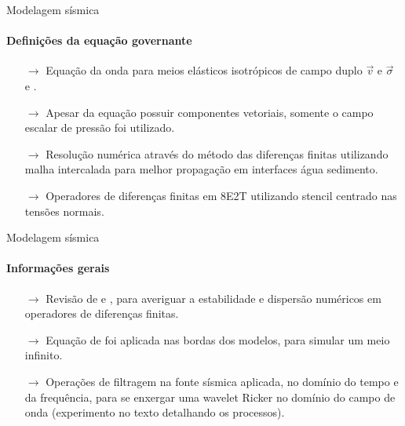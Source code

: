 \documentclass[xcolor=dvipsnames,t]{beamer}
\begin{document}
\begin{frame}{Modelagem sísmica}
\framesubtitle{Definições da equação governante}	
	
\pause
\begin{itemize}
	\small
	\item[$\to$] Equação da onda para meios elásticos isotrópicos de campo duplo $\vec{v}$  e $\vec{\sigma}$  e .
	\smallskip\smallskip\smallskip\smallskip\smallskip\smallskip\smallskip
	
	\pause
	\item[$\to$] Apesar da equação possuir componentes vetoriais, somente o campo escalar de pressão foi utilizado. 
	\smallskip\smallskip\smallskip\smallskip\smallskip\smallskip\smallskip
	
	\pause
	\item[$\to$] Resolução numérica através do método das diferenças finitas utilizando malha intercalada para melhor propagação em interfaces água sedimento. 
	\smallskip\smallskip\smallskip\smallskip\smallskip\smallskip\smallskip
	
	\pause
	\item[$\to$] Operadores de diferenças finitas em 8E2T utilizando stencil centrado nas tensões normais.    
\end{itemize}	
	
\end{frame}
\begin{frame}{Modelagem sísmica}
\framesubtitle{Informações gerais}	

\begin{itemize}
	\small
 	
	\item[$\to$] Revisão de  e , para averiguar a estabilidade e dispersão numéricos em operadores de diferenças finitas.
	\smallskip\smallskip\smallskip\smallskip\smallskip\smallskip\smallskip
	
	\pause
	\item[$\to$] Equação de  foi aplicada nas bordas dos modelos, \newline para simular um meio infinito.  
	\smallskip\smallskip\smallskip\smallskip\smallskip\smallskip\smallskip
	
	\pause
	\item[$\to$] Operações de filtragem na fonte sísmica aplicada, no domínio do tempo e da frequência, para se enxergar uma wavelet Ricker no domínio do campo de onda (experimento no texto detalhando os processos). 
\end{itemize}	
	
\end{frame}
\end{document}

